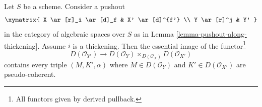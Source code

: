 %
\begin{lemma}
\label{lemma-pushout-along-thickening-derived}
Let $S$ be a scheme. Consider a pushout
$$
\xymatrix{
X \ar[r]_i \ar[d]_f & X' \ar[d]^{f'}
\\
Y \ar[r]^j & Y'
}
$$
in the category of algebraic spaces over $S$
as in Lemma \ref{lemma-pushout-along-thickening}.
Assume $i$ is a thickening. Then the essential
image of the functor\footnote{All functors given by derived pullback.}
$$
D(\mathcal{O}_{Y'}) \longrightarrow
D(\mathcal{O}_Y) \times_{D(\mathcal{O}_X)} D(\mathcal{O}_{X'})
$$
contains every triple $(M, K', \alpha)$ where $M \in D(\mathcal{O}_Y)$
and $K' \in D(\mathcal{O}_{X'})$ are pseudo-coherent.
\end{lemma}


